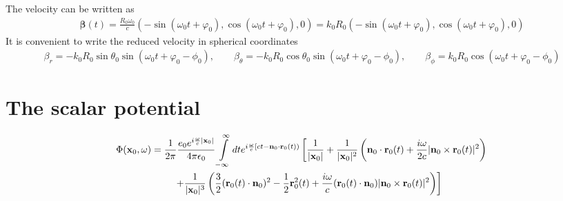 The velocity can be written as
\begin{align}
    {\boldsymbol{\beta}}(t)=\frac{R_0\omega_0}{c}\left(-\sin(\omega_0 t+\varphi_0), \cos(\omega_0 t+\varphi_0), 0\right)=k_0R_0\left(-\sin(\omega_0 t+\varphi_0), \cos(\omega_0 t+\varphi_0), 0\right)
\end{align}
It is convenient to write the reduced velocity in spherical coordinates
\begin{align}
    \beta_r = -k_0 R_0\sin\theta_0 \sin(\omega_0 t+\varphi_0-\phi_0), \qquad \beta_\theta = -k_0 R_0\cos\theta_0 \sin(\omega_0 t+\varphi_0-\phi_0), \qquad \beta_\phi = k_0 R_0\cos(\omega_0 t+\varphi_0-\phi_0)
\end{align}



\section{The scalar potential}

\begin{align}
     & \Phi({\bf x}_0,\omega)=\frac1{2\pi}\frac{e_0 e^{i\frac{\omega}c|{\bf x}_0|}}{4\pi\epsilon_0}\int\limits_{-\infty}^{\infty}dte^{i\frac{\omega}c\left[ct-{\bf n}_0\cdot{\bf r}_0(t)\right)}                                     \left[\frac1{|{\bf x}_0|} +\frac1{|{\bf x}_0|^2}\left({{\bf n}_0\cdot{\bf r}_0(t)}+\frac{i\omega}{2c}{|{\bf n}_0\times{\bf r}_0(t)|^2} \right)       \right.\nonumber \\
     & \qquad \qquad \qquad \left.+\frac1{|{\bf x}_0|^3}\left(\frac32({\bf r}_0(t)
    \cdot{\bf n}_0)^2-\frac12{\bf r}^2_0(t)+\frac{i\omega}c({\bf r}_0(t)
    \cdot{\bf n}_0) |{\bf n}_0\times{\bf r}_0(t)|^2\right)     \right]\end{align}


